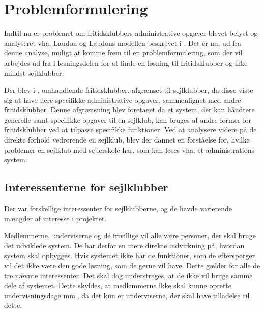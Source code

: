 \chapter{Problemformulering}\label{chap:problemformulering-new}

Indtil nu er problemet om fritidsklubbers administrative opgaver blevet belyst og analyseret vha. Laudon og Laudons modellen beskrevet i . 
Det er nu, ud fra denne analyse, muligt at komme frem til en problemformulering, som der vil arbejdes ud fra i løsningsdelen for at finde en løsning til fritidsklubber og ikke mindst sejlklubber.

Der blev i , omhandlende fritidsklubber, afgrænset til sejlklubber, da disse viste sig at have flere specifikke administrative opgaver, sammenlignet med andre fritidsklubber. 
Denne afgrænsning blev foretaget da et system, der kan håndtere generelle samt specifikke opgaver til en sejlklub, kan bruges af andre former for fritidsklubber ved at tilpasse specifikke funktioner.
Ved at analysere videre på de direkte forhold vedrørende en sejlklub, blev der dannet en forståelse for, hvilke problemer en sejlklub med sejlerskole har, som kan løses vha. et administrations system.


\section{Interessenterne for sejlklubber}

Der var forskellige interessenter for sejlklubberne, og de havde varierende mængder af interesse i projektet. 

Medlemmerne, underviserne og de frivillige vil alle være personer, der skal bruge det udviklede system. 
De har derfor en mere direkte indvirkning på, hvordan system skal opbygges. 
Hvis systemet ikke har de funktioner, som de efterspørger, vil det ikke være den gode løsning, som de gerne vil have. 
Dette gælder for alle de tre nævnte interessenter. 
Det skal dog understreges, at de ikke vil bruge samme dele af systemet. 
Dette skyldes, at medlemmerne ikke skal kunne oprette undervisningsdage mm., da det kun er underviserne, der skal have tilladelse til dette. 

